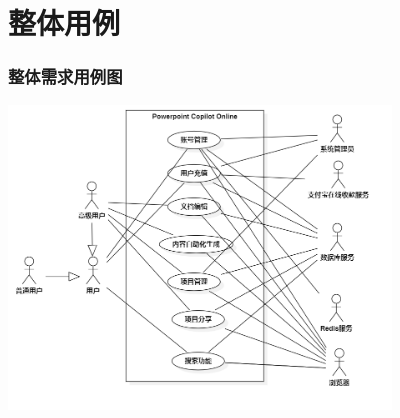 \section{整体用例}
\begin{frame}
    \frametitle{整体需求用例图}
    \center
    \includegraphics[width=4in]{contents/figure/overal_usecase_diagram.png}

\end{frame}